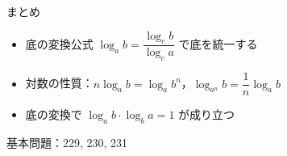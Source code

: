 \documentclass[aspectratio=43,professionalfonts,handout]{beamer}
\begin{document}
\begin{frame}{まとめ}
  \begin{itemize}
    \item 底の変換公式 $\log_a b = \dfrac{\log_c b}{\log_c a}$ で底を統一する
    \item 対数の性質：$n \log_a b = \log_a b^n$，$\log_{a^n} b = \dfrac{1}{n}\log_a b$
    \item 底の変換で $\log_a b \cdot \log_b a = 1$ が成り立つ
  \end{itemize}

  \vfill
  {\small 基本問題：229, 230, 231}
\end{frame}
\end{document}
